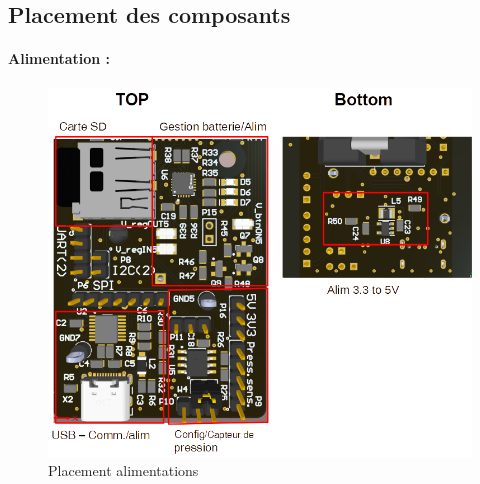 \subsection{Placement des composants} \label{ssec:placementComp}
{
\paragraph{Alimentation :}
\begin{figure}[h]
	\centering
	\includegraphics[width=0.9\linewidth]{Figures/BasPCB}
	\caption{Placement alimentations}
	\label{fig:baspcb}
\end{figure}

}
